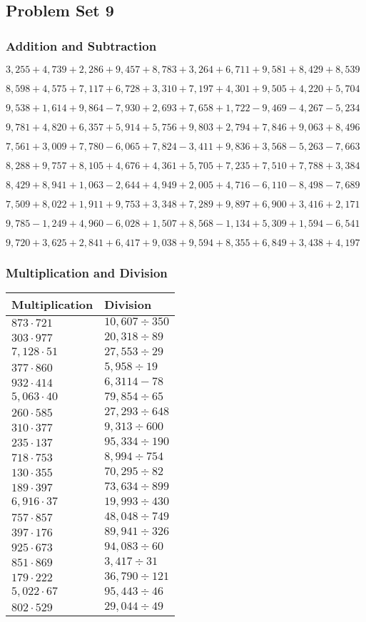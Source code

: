 \hypertarget{problem-set-9-3}{%
\subsection{Problem Set 9}\label{problem-set-9-3}}

\hypertarget{addition-and-subtraction-171}{%
\subsubsection{Addition and
Subtraction}\label{addition-and-subtraction-171}}

\(3,255+4,739+2,286+9,457+8,783+3,264+6,711+9,581+8,429+ 8,539\)

\(8,598+4,575+7,117+6,728+3,310+7,197+4,301+9,505+4,220+5,704\)

\(9,538+1,614+9,864-7,930+2,693+7,658+1,722-9,469-4,267-5,234\)

\(9,781+4,820+6,357+5,914+5,756+9,803+2,794+7,846+9,063+8,496\)

\(7,561+3,009+7,780-6,065+7,824-3,411+9,836+3,568-5,263-7,663\)

\(8,288+9,757+8,105+4,676+4,361+5,705+7,235+7,510+7,788+3,384\)

\(8,429+8,941+1,063-2,644+4,949+2,005+4,716-6,110-8,498-7,689\)

\(7,509+8,022+1,911+9,753+3,348+7,289+9,897+6,900+3,416+2,171\)

\(9,785-1,249+4,960-6,028+1,507+8,568-1,134+5,309+1,594-6,541\)

\(9,720+3,625+2,841+6,417+9,038+9,594+8,355+6,849+3,438+4,197\)

\hypertarget{multiplication-and-division-170}{%
\subsubsection{Multiplication and
Division}\label{multiplication-and-division-170}}

\begin{longtable}[]{@{}ll@{}}
\toprule
Multiplication & Division\tabularnewline
\midrule
\endhead
\(873\cdot721\) & \(10,607÷350\)\tabularnewline
\(303\cdot977\) & \(20,318÷89\)\tabularnewline
\(7,128\cdot51\) & \(27,553÷29\)\tabularnewline
\(377\cdot860\) & \(5,958÷19\)\tabularnewline
\(932\cdot414\) & \(6,311 4-78\)\tabularnewline
\(5,063\cdot40\) & \(79,854÷65\)\tabularnewline
\(260\cdot585\) & \(27,293÷648\)\tabularnewline
\(310\cdot377\) & \(9,313÷600\)\tabularnewline
\(235\cdot137\) & \(95,334÷190\)\tabularnewline
\(718\cdot753\) & \(8,994÷754\)\tabularnewline
\(130\cdot355\) & \(70,295÷82\)\tabularnewline
\(189\cdot397\) & \(73,634÷899\)\tabularnewline
\(6,916\cdot37\) & \(19,993÷430\)\tabularnewline
\(757\cdot857\) & \(48,048÷749\)\tabularnewline
\(397\cdot176\) & \(89,941÷326\)\tabularnewline
\(925\cdot673\) & \(94,083÷60\)\tabularnewline
\(851\cdot869\) & \(3,417÷31\)\tabularnewline
\(179\cdot222\) & \(36,790÷121\)\tabularnewline
\(5,022\cdot67\) & \(95,443÷46\)\tabularnewline
\(802\cdot529\) & \(29,044÷49\)\tabularnewline
\bottomrule
\end{longtable}

